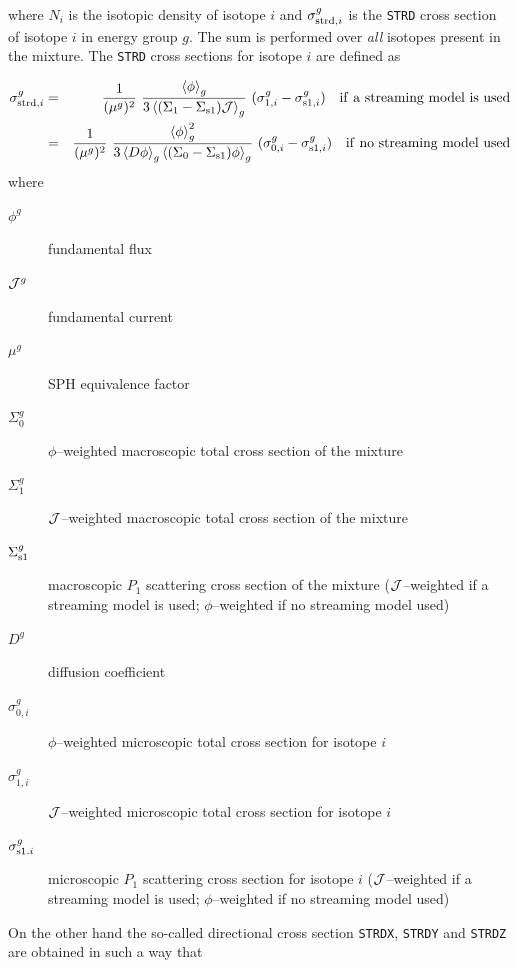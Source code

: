 \noindent where $N_i$ is the isotopic density of isotope $i$ and $\sigma_{{\rm strd},i}^g$
is the {\tt STRD} cross section of isotope $i$ in energy group $g$. The sum is
performed over {\sl all} isotopes present in the mixture. The {\tt STRD} cross
sections for isotope $i$ are defined as

\begin{eqnarray}
\sigma_{{\rm strd},i}^g&=&{1\over (\mu^g)^2} \ {\left<\phi \right>_g \over 3
\left<(\Sigma_1-\Sigma_{\rm s1}){\cal J}\right>_g} \ (\sigma_{1,i}^g-\sigma_{{\rm
s1},i}^g) \ \
\ {\rm if \ a \ streaming \ model \ is \ used} \\
&=&{1\over (\mu^g)^2} \ {\left<\phi \right>_g^2 \over 3 \left< D \phi \right>_g
\left<(\Sigma_0-\Sigma_{\rm s1})\phi\right>_g} \ (\sigma_{0,i}^g-\sigma_{{\rm
s1},i}^g) \ \
\ {\rm if \ no \ streaming \ model \ used}
\end{eqnarray}
\noindent where

\begin{description}
\item [$\phi^g$] fundamental flux
\item [${\cal J}^g$] fundamental current
\item [$\mu^g$] SPH equivalence factor
\item [$\Sigma_0^g$] $\phi$--weighted macroscopic total cross section of the
mixture
\item [$\Sigma_1^g$] ${\cal J}$--weighted macroscopic total cross section of the
mixture
\item [$\Sigma_{\rm s1}^g$] macroscopic $P_1$ scattering cross section of the
mixture (${\cal J}$--weighted
if a streaming model is used; $\phi$--weighted if no streaming model used)
\item [$D^g$] diffusion coefficient
\item [$\sigma_{0,i}^g$] $\phi$--weighted microscopic total cross section for
isotope $i$
\item [$\sigma_{1,i}^g$] ${\cal J}$--weighted microscopic total cross section for
isotope $i$
\item [$\sigma_{{\rm s1}.i}^g$] microscopic $P_1$ scattering cross section for
isotope $i$ (${\cal J}$--weighted
if a streaming model is used; $\phi$--weighted if no streaming model used)
\end{description}

\vskip 0.2cm

On the other hand the so-called directional cross
section {\tt STRDX}, {\tt STRDY}
and {\tt STRD\blank{1}Z} are obtained in such a way that

